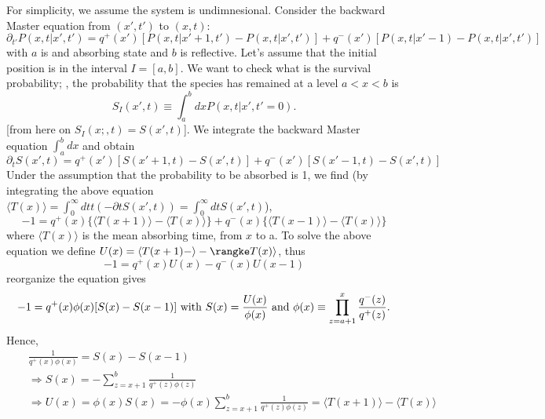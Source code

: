 \documentclass[%
 amsmath,amssymb,
 reprint,%
]{revtex4-2}
\begin{document}
\begin{widetext}
For simplicity, we assume the system is undimnesional. Consider the backward Master equation from $(x',t')$ to $(x,t)$:
\begin{equation}
    \partial_{t'} P(x,t|x',t')=q^{+}(x')\left[P(x,t|x'+1,t')-P(x,t|x',t')\right]+q^-(x')\left[P(x,t|x'-1)-P(x,t|x',t')\right]
\end{equation}
with $a$ is and absorbing state and $b$ is reflective. 
Let's assume that the initial position is in the interval $I=[a,b]$. We want to check what is the survival probability; , the probability that the species has remained at a level $a<x<b$ is
\begin{equation}
    S_I(x',t) \equiv \int_{a}^{b}dx P(x,t|x',t'=0). 
\end{equation}
[from here on $S_I(x;,t)=S(x',t)$].
We integrate the backward Master equation $\int_a^{b}dx$ and obtain
\begin{equation}
    \partial_{t} S(x',t)=q^{+}(x')\left[S(x'+1,t)-S(x',t)\right]+q^-(x')\left[S(x'-1,t)-S(x',t)\right]
\end{equation}
Under the assumption that the probability to be absorbed is 1, we find (by integrating the above equation $\langle T(x) \rangle = \int_0^{\infty}dt t (-\partial t S(x',t))=\int_0^{\infty} dt S(x',t)$),
\begin{equation}
    -1=q^+(x)\{\langle T(x+1)\rangle- \langle T(x)\rangle \} + q^- (x) \{\langle T(x-1)\rangle - \langle T(x)\rangle \}  
\end{equation}
where $\langle T(x)\rangle $ is the mean absorbing time, from $x$ to a.  
To solve the above equation we define $U(x)=\langle T(x+1)-\rangle -\rangke T(x)\rangle$, thus
\begin{equation}
    -1=q^+(x)U(x)-q^-(x)U(x-1)
\end{equation}
reorganize the equation gives
\begin{equation}
        -1=q^+(x)\phi(x)[S(x)-S(x-1)] {\rm \ with \  } S(x)=\frac{U(x)}{\phi(x)} {\rm \ and \ } \phi(x)\equiv \prod_{z={a+1}}^{x}\frac{q^-(z)}{q^+(z)}.
\end{equation}
Hence,
\begin{eqnarray}
&&    \frac{1}{q^+(x)\phi(x)}=S(x)-S(x-1)
\\
&& {\Longrightarrow } S(x) = -\sum_{z=x+1}^{b}\frac{1}{q^+(z)\phi(z)} \nonumber
\\  && \Longrightarrow U(x) = \phi(x) S(x) =- \phi(x)\sum_{z=x+1}^{b}\frac{1}{q^+(z)\phi(z)} = \langle T(x+1)\rangle - \langle T(x) \rangle \nonumber
\end{eqnarray}

\end{widetext}
\end{document}
